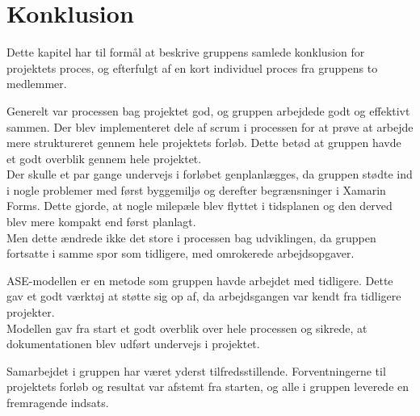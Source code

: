 \chapter{Konklusion}
Dette kapitel har til formål at beskrive gruppens samlede konklusion for projektets proces, og efterfulgt af en kort individuel proces fra gruppens to medlemmer. 

Generelt var processen bag projektet god, og gruppen arbejdede godt og effektivt sammen.
Der blev implementeret dele af scrum i processen for at prøve at arbejde mere struktureret gennem hele projektets forløb. Dette betød at gruppen havde et godt overblik gennem hele projektet. \\
Der skulle et par gange undervejs i forløbet genplanlægges, da gruppen stødte ind i nogle problemer med først byggemiljø og derefter begrænsninger i Xamarin Forms. Dette gjorde, at nogle milepæle blev flyttet i tidsplanen og den derved blev mere kompakt end først planlagt. \\
Men dette ændrede ikke det store i processen bag udviklingen, da gruppen fortsatte i samme spor som tidligere, med omrokerede arbejdsopgaver.

ASE-modellen er en metode som gruppen havde arbejdet med tidligere. Dette gav et godt værktøj at støtte sig op af, da arbejdsgangen var kendt fra tidligere projekter. \\
Modellen gav fra start et godt overblik over hele processen og sikrede, at dokumentationen blev udført undervejs i projektet.

Samarbejdet i gruppen har været yderst tilfredsstillende. Forventningerne til projektets forløb og resultat var afstemt fra starten, og alle i gruppen leverede en fremragende indsats.